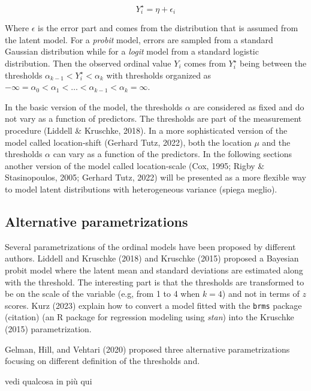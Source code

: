 \documentclass[
  man,floatsintext]{apa6}
\begin{document}
\begin{equation} 
Y^\star_i = \eta + \epsilon_i
\label{eq:latent-model}
\end{equation}

Where \(\epsilon\) is the error part and comes from the distribution that is assumed from the latent model. For a \emph{probit} model, errors are sampled from a standard Gaussian distribution while for a \emph{logit} model from a standard logistic distribution. Then the observed ordinal value \(Y_i\) comes from \(Y^\star_i\) being between the thresholds \(\alpha_{k - 1} < Y^\star_i < \alpha_{k}\) with thresholds organized as \(- \infty = \alpha_0 < \alpha_1 < \dots< \alpha_{k - 1} < \alpha_k = \infty\).

In the basic version of the model, the thresholds \(\alpha\) are considered as fixed and do not vary as a function of predictors. The thresholds are part of the measurement procedure (Liddell \& Kruschke, 2018). In a more sophisticated version of the model called location-shift (Gerhard Tutz, 2022), both the location \(\mu\) and the thresholds \(\alpha\) can vary as a function of the predictors. In the following sections another version of the model called location-scale (Cox, 1995; Rigby \& Stasinopoulos, 2005; Gerhard Tutz, 2022) will be presented as a more flexible way to model latent distributions with heterogeneous variance (spiega meglio).

\subsection{Alternative parametrizations}\label{alternative-parametrizations}

Several parametrizations of the ordinal models have been proposed by different authors. Liddell and Kruschke (2018) and Kruschke (2015) proposed a Bayesian probit model where the latent mean and standard deviations are estimated along with the threshold. The interesting part is that the thresholds are transformed to be on the scale of the variable (e.g, from 1 to 4 when \(k = 4\)) and not in terms of \(z\) scores. Kurz (2023) explain how to convert a model fitted with the \texttt{brms} package (citation) (an R package for regression modeling using \emph{stan}) into the Kruschke (2015) parametrization.

Gelman, Hill, and Vehtari (2020) proposed three alternative parametrizations focusing on different definition of the thresholds and.

vedi qualcosa in più qui
\end{document}
